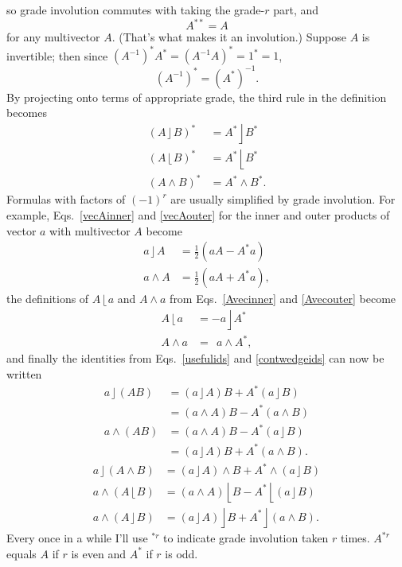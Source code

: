 \documentclass{utarticle}
\DeclareMathOperator{\lin}{\rfloor}
\DeclareMathOperator{\rin}{\lfloor}
\DeclareMathOperator{\out}{\wedge}
\newcommand{\grinv}[2][]{\ensuremath{#2^{*#1}}}
\newcommand{\doublegrinv}[1]{\ensuremath{#1^{**}}}
\newcommand{\half}{\ensuremath{\frac{1}{2}}}
\begin{document}
so grade involution commutes with taking the grade-$r$ part, and
\begin{equation} \doublegrinv{A} = A \end{equation} 
for any multivector $A$.  (That's what makes it an involution.)  Suppose $A$ is invertible;
then since $\grinv{(A^{-1})}\grinv{A} = \grinv{(A^{-1} A)} = \grinv{1} = 1$,
\begin{equation} \grinv{(A^{-1})} = (\grinv{A})^{-1}. \end{equation}
By projecting onto terms of appropriate grade, the third rule in the definition becomes
\begin{align}
\grinv{(A \lin B)} & = \grinv{A} \lin \grinv{B} \nonumber \\
\grinv{(A \rin B)} & = \grinv{A} \rin \grinv{B} \nonumber \\ 
\grinv{(A \out B)} & = \grinv{A} \out \grinv{B}.
\label{invprods}
\end{align}
Formulas with factors of $(-1)^r$ are usually simplified by 
grade involution.  For example, Eqs.~\eqref{vecAinner} and \eqref{vecAouter} 
for the inner and outer products of vector $a$ with multivector $A$ become
\begin{align}
a \lin A & = \half(a A - \grinv{A} a) \nonumber \\ 
a \out A & = \half(a A + \grinv{A} a),
\end{align}
the definitions of $A \rin a$ and $A \out a$ from Eqs.~\eqref{Avecinner} and 
\eqref{Avecouter} become
\begin{align}
A \rin  a & = -a \lin \grinv{A} \nonumber \\
A \out a & = \ \ a \out \grinv{A},
\end{align}
and finally the identities from Eqs.~\eqref{usefulids} and \eqref{contwedgeids} can 
now be written
\begin{align}
a \lin (A B) & = (a \lin A) B + \grinv{A} (a \lin B) \nonumber \\
                   & = (a \out A) B - \grinv{A} (a \out B) \nonumber \\
a \out (A B) & = (a \out A) B - \grinv{A} (a \lin B) \nonumber \\
                   & = (a \lin A) B + \grinv{A} (a \out B).
\end{align}
\begin{align}
a \lin (A \out B) & = (a \lin A) \out B + \grinv{A} \out (a \lin B) \nonumber \\
a \out (A \rin B) & = (a \out A) \rin B - \grinv{A} \rin (a \lin B) \nonumber \\
a \out (A \lin B) & = (a \lin A) \lin B + \grinv{A} \lin (a \out B).
\end{align}
Every once in a while I'll use \grinv[r]{} to indicate grade involution taken $r$ 
times.  $\grinv[r]{A}$ equals $A$ if $r$ is even and $\grinv{A}$ if $r$ is odd.
\end{document}
